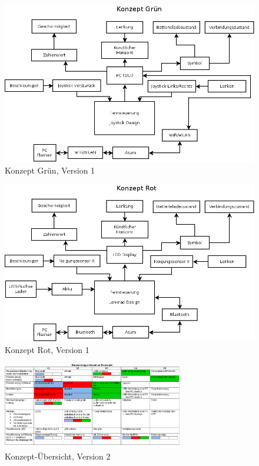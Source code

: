 \begin{figure}
	\centering
	\includegraphics[width=\textwidth]{konzepte_v1/Konzept_Gruen.png}
	\caption{Konzept Grün, Version 1}
	\label{fig:gruen_v1}
\end{figure}

\begin{figure}
	\centering
	\includegraphics[width=\textwidth]{konzepte_v1/Konzept_Rot.png}
	\caption{Konzept Rot, Version 1}
	\label{fig:rot_v1}
\end{figure}

\begin{figure}
	\centering
	\includegraphics[angle=90, width=0.7\textwidth]{konzepte_v2/Konzepte.pdf}
	\caption{Konzept-Übersicht, Version 2}
	\label{fig:konzepte2}
\end{figure}

